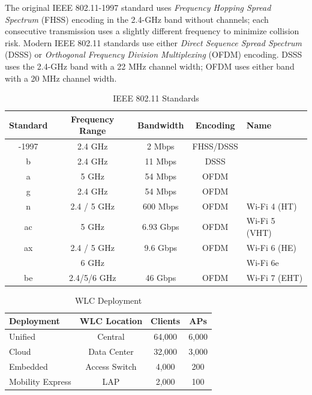 \documentclass[12pt]{article}
\begin{document}
	The original IEEE 802.11-1997 standard uses \textit{Frequency Hopping Spread Spectrum} (FHSS) encoding in the 2.4-GHz band without channels; each consecutive transmission uses a slightly different frequency to minimize collision risk. Modern IEEE 802.11 standards use either \textit{Direct Sequence Spread Spectrum} (DSSS) or \textit{Orthogonal Frequency Division Multiplexing} (OFDM) encoding. DSSS uses the 2.4-GHz band with a 22 MHz channel width; OFDM uses either band with a 20 MHz channel width.

	\begin{table}[H]
	\centering
	\caption{IEEE 802.11 Standards \label{tab:802.11 STANDARDS}}
	\begin{tabular}{ccccl}\hline
	\textbf{Standard}	& \textbf{Frequency Range}	& \textbf{Bandwidth}	& \textbf{Encoding}	& \textbf{Name}\\\hline
	-1997			& 2.4 GHz				& 2 Mbps			& FHSS/DSSS\\\hline
	b 			& 2.4 GHz 				& 11 Mbps			& DSSS\\\hline
	a 			& 5 GHz				& 54 Mbps 			& OFDM\\\hline
	g 			& 2.4 GHz				& 54 Mbps 			& OFDM\\\hline
	n 			& 2.4 / 5 GHz			& 600 Mbps		& OFDM 			& Wi-Fi 4 (HT)\\\hline
	ac 			& 5 GHz				& 6.93 Gbps		& OFDM			& Wi-Fi 5 (VHT)\\\hline
	ax			& 2.4 / 5 GHz			& 9.6 Gbps			& OFDM			& Wi-Fi 6 (HE)\\
				& 6 GHz				&				& 				& Wi-Fi 6e\\\hline
	be 			& 2.4/5/6 GHz			& 46 Gbps			& OFDM			& Wi-Fi 7 (EHT)\\\hline
	\end{tabular}\end{table}

	\begin{table}[H]
	\centering
	\caption{WLC Deployment \label{tab:WLC DEPLOYMENT}}
	\begin{tabular}{lccc}\hline
	\textbf{Deployment}	& \textbf{WLC Location}	& \textbf{Clients}		& \textbf{APs}\\\hline
	Unified			& Central				& 64,000			& 6,000\\\hline
	Cloud			& Data Center 			& 32,000			& 3,000\\\hline
	Embedded			& Access Switch			& 4,000 			& 200\\\hline
	Mobility Express		& LAP 				& 2,000			& 100\\\hline
	\end{tabular}\end{table}
\end{document}
